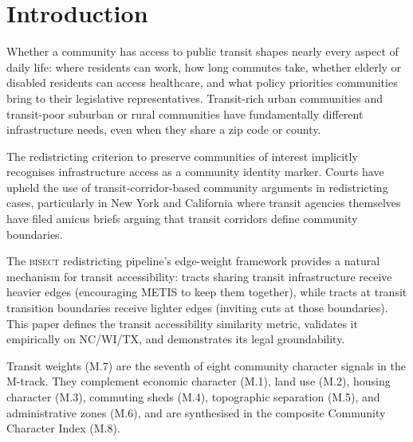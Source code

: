 \section{Introduction}

Whether a community has access to public transit shapes nearly every aspect of daily life: where residents can work, how long commutes take, whether elderly or disabled residents can access healthcare, and what policy priorities communities bring to their legislative representatives. Transit-rich urban communities and transit-poor suburban or rural communities have fundamentally different infrastructure needs, even when they share a zip code or county.

The redistricting criterion to preserve communities of interest implicitly recognises infrastructure access as a community identity marker. Courts have upheld the use of transit-corridor-based community arguments in redistricting cases, particularly in New York and California where transit agencies themselves have filed amicus briefs arguing that transit corridors define community boundaries.

The \textsc{bisect} redistricting pipeline's edge-weight framework provides a natural mechanism for transit accessibility: tracts sharing transit infrastructure receive heavier edges (encouraging METIS to keep them together), while tracts at transit transition boundaries receive lighter edges (inviting cuts at those boundaries). This paper defines the transit accessibility similarity metric, validates it empirically on NC/WI/TX, and demonstrates its legal groundability.

Transit weights (M.7) are the seventh of eight community character signals in the M-track. They complement economic character (M.1), land use (M.2), housing character (M.3), commuting sheds (M.4), topographic separation (M.5), and administrative zones (M.6), and are synthesised in the composite Community Character Index (M.8).
